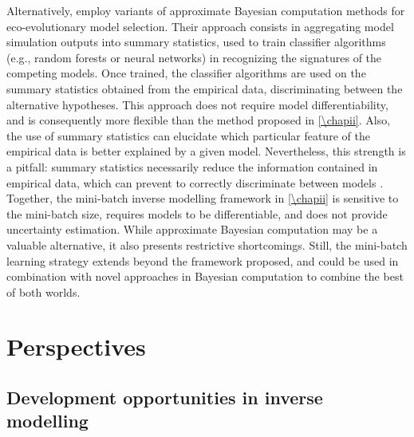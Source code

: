 % 
Alternatively, \cite{Sukumaran2016,Skeels2019,Skeels2022} employ variants of approximate Bayesian computation methods \citep{Csillery2010} for eco-evolutionary model selection. Their approach consists in aggregating model simulation outputs into summary statistics, used to train classifier algorithms (e.g., random forests or neural networks) in recognizing the signatures of the competing models. Once trained, the classifier algorithms are used on the summary statistics obtained from the empirical data, discriminating between the alternative hypotheses. 
% 
This approach does not require model differentiability, and is consequently more flexible than the method proposed in \cref{\chapii}. Also, the use of summary statistics can elucidate which particular feature of the empirical data is better explained by a given model. 
% 
Nevertheless, this strength is a pitfall: summary statistics necessarily reduce the information contained in empirical data, which can prevent to correctly discriminate between models \citep{Csillery2010}.
% 
Together, the mini-batch inverse modelling framework in \cref{\chapii} is sensitive to the mini-batch size, requires models to be differentiable, and does not provide uncertainty estimation. While approximate Bayesian computation may be a valuable alternative, it also presents restrictive shortcomings. Still, the mini-batch learning strategy extends beyond the framework proposed, and could be used in combination with novel approaches in Bayesian computation to combine the best of both worlds.

\section{Perspectives}

\subsection{Development opportunities in inverse modelling}

